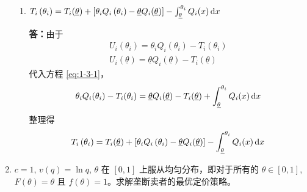 \documentclass[UTF8]{article} %
\begin{document}
\begin{enumerate}
\begin{enumerate}
        \item $T_{i}\left(\theta_{i}\right)=T_{i}(\underline{\theta})+\left[\theta_{i} Q_{i}\left(\theta_{i}\right)-\underline{\theta} Q_{i}(\underline{\theta})\right]-\int_{\underline{\theta}}^{\theta_{i}} Q_{i}(x) \operatorname{d\!} x$
        
        \textbf{答：}由于
        \begin{gather*}
            U_i(\theta_i) = \theta_i Q_i(\theta_i) - T_i(\theta_i) \\
            U_i(\underline{\theta}) = \underline{\theta} Q_i(\underline{\theta}) - T_i(\underline{\theta})
        \end{gather*}
        代入方程 \eqref{eq:1-3-1}，
        \[ \theta_i Q_i(\theta_i) - T_i(\theta_i) = \underline{\theta} Q_i(\underline{\theta}) - T_i(\underline{\theta}) + \int_{\underline{\theta}}^{\theta_{i}} Q_{i}(x) \operatorname{d\!} x \]
        整理得
        \begin{gather}
            T_{i}\left(\theta_{i}\right)=T_{i}(\underline{\theta})+\left[\theta_{i} Q_{i}\left(\theta_{i}\right)-\underline{\theta} Q_{i}(\underline{\theta})\right]-\int_{\underline{\theta}}^{\theta_{i}} Q_{i}(x) \operatorname{d\!} x
        \end{gather}
    \end{enumerate}
    
    
    \item $c=1$, $v(q)=\ln q$, $\theta$ 在 $[0,1]$ 上服从均匀分布，即对于所有的 $\theta\in[0,1]$, $F(\theta)=\theta$ 且 $f(\theta)=1$。求解垄断卖者的最优定价策略。
    

\end{enumerate}
\end{document}
